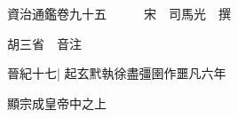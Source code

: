 






























































資治通鑑卷九十五　　　宋　司馬光　撰

胡三省　音注

晉紀十七|{
	起玄黓執徐盡彊圉作噩凡六年}


顯宗成皇帝中之上

